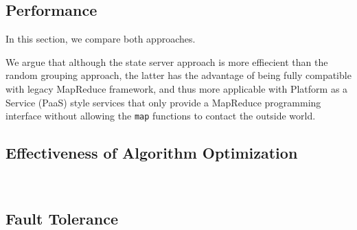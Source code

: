 
\subsection{Performance}

In this section, we compare both approaches.




We argue that although the state server approach is more effiecient than the random grouping approach, the latter has the advantage of being fully compatible with legacy MapReduce framework, and thus more applicable with Platform as a Service (PaaS) style services that only provide a MapReduce programming interface without allowing the \texttt{map} functions to contact the outside world.

\subsection{Effectiveness of Algorithm Optimization}\


\subsection{Fault Tolerance}\


